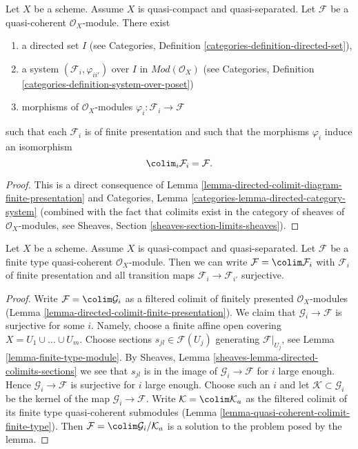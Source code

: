 \begin{lemma}
\label{lemma-directed-colimit-finite-presentation}
Let $X$ be a scheme. Assume $X$ is quasi-compact and quasi-separated.
Let $\mathcal{F}$ be a quasi-coherent $\mathcal{O}_X$-module.
There exist
\begin{enumerate}
\item a directed set $I$ (see
Categories, Definition \ref{categories-definition-directed-set}),
\item a system $(\mathcal{F}_i, \varphi_{ii'})$
over $I$ in $\textit{Mod}(\mathcal{O}_X)$ (see
Categories, Definition \ref{categories-definition-system-over-poset})
\item morphisms of $\mathcal{O}_X$-modules
$\varphi_i : \mathcal{F}_i \to \mathcal{F}$
\end{enumerate}
such that each $\mathcal{F}_i$ is of finite presentation
and such that the morphisms $\varphi_i$ induce an isomorphism
$$
\colim_i \mathcal{F}_i
=
\mathcal{F}.
$$
\end{lemma}

\begin{proof}
This is a direct consequence of
Lemma \ref{lemma-directed-colimit-diagram-finite-presentation} and
Categories, Lemma \ref{categories-lemma-directed-category-system}
(combined with the fact that
colimits exist in the category of sheaves of $\mathcal{O}_X$-modules, see
Sheaves, Section \ref{sheaves-section-limits-sheaves}).
\end{proof}

\begin{lemma}
\label{lemma-finite-directed-colimit-surjective-maps}
Let $X$ be a scheme. Assume $X$ is quasi-compact and quasi-separated.
Let $\mathcal{F}$ be a finite type quasi-coherent $\mathcal{O}_X$-module.
Then we can write $\mathcal{F} = \colim \mathcal{F}_i$ with $\mathcal{F}_i$
of finite presentation and all transition maps
$\mathcal{F}_i \to \mathcal{F}_{i'}$ surjective.
\end{lemma}

\begin{proof}
Write $\mathcal{F} = \colim \mathcal{G}_i$ as a filtered colimit of
finitely presented $\mathcal{O}_X$-modules
(Lemma \ref{lemma-directed-colimit-finite-presentation}).
We claim that $\mathcal{G}_i \to \mathcal{F}$ is surjective for some $i$.
Namely, choose a finite affine open covering $X = U_1 \cup \ldots \cup U_m$.
Choose sections $s_{jl} \in \mathcal{F}(U_j)$ generating
$\mathcal{F}|_{U_j}$, see Lemma \ref{lemma-finite-type-module}.
By Sheaves, Lemma \ref{sheaves-lemma-directed-colimits-sections}
we see that $s_{jl}$ is in the image of $\mathcal{G}_i \to \mathcal{F}$
for $i$ large enough. Hence $\mathcal{G}_i \to \mathcal{F}$ is surjective
for $i$ large enough. Choose such an $i$ and let
$\mathcal{K} \subset \mathcal{G}_i$ be the kernel of the map
$\mathcal{G}_i \to \mathcal{F}$. Write $\mathcal{K} = \colim \mathcal{K}_a$
as the filtered colimit of its finite type quasi-coherent submodules
(Lemma \ref{lemma-quasi-coherent-colimit-finite-type}). Then
$\mathcal{F} = \colim \mathcal{G}_i/\mathcal{K}_a$ is a solution
to the problem posed by the lemma.
\end{proof}

